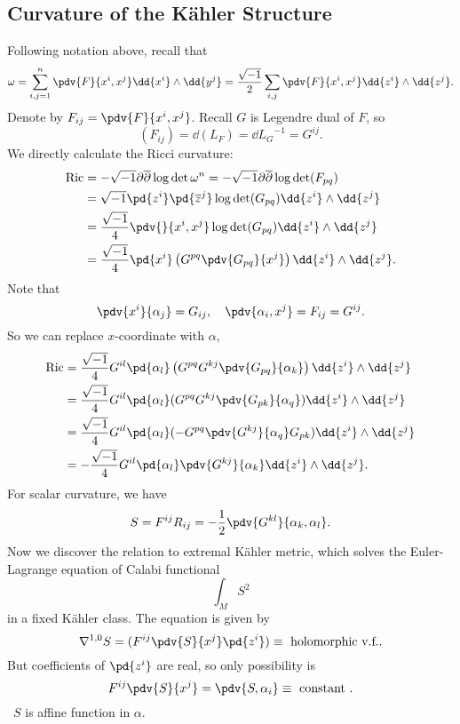 \documentclass[12pt]{article}
\theoremstyle{plain}\newtheorem{theorem}{Theorem}
\theoremstyle{definition}\newtheorem{definition}[theorem]{Definition}
\theoremstyle{definition}\newtheorem{example}[theorem]{Example}
\theoremstyle{plain}\newtheorem{axiom}[theorem]{Axiom}
\theoremstyle{plain}\newtheorem{assertion}[theorem]{Assertion}
\theoremstyle{plain}\newtheorem{corollary}[theorem]{Corollary}
\theoremstyle{plain}\newtheorem{lemma}[theorem]{Lemma}
\theoremstyle{plain}\newtheorem{proposition}[theorem]{Proposition}
\theoremstyle{plain}\newtheorem{prop}[theorem]{Proposition}
\theoremstyle{plain}\newtheorem{conjecture}[theorem]{Conjecture}
\theoremstyle{plain}\newtheorem{conj}[theorem]{Conjecture}
\theoremstyle{plain}\newtheorem{problem}[theorem]{Problem}
\theoremstyle{remark}\newtheorem{notation}[theorem]{Notation}
\theoremstyle{definition}\newtheorem*{question}{Question}
\theoremstyle{definition}\newtheorem*{answer}{Answer}
\theoremstyle{definition}\newtheorem*{goal}{Goal}
\theoremstyle{plain}\newtheorem*{application}{Application}
\theoremstyle{plain}\newtheorem*{exercise}{Exercise}
\theoremstyle{remark}\newtheorem*{remark}{Remark}
\theoremstyle{remark}\newtheorem*{note}{\small{Note}}
\numberwithin{equation}{section}
\numberwithin{theorem}{section}
\numberwithin{figure}{section}
\begin{document}
\subsection{Curvature of the K\"ahler Structure}
Following notation above, recall that \[
    \omega=\sum_{i,j=1}^{n}\pdv{F}{x^i,x^j}\dd{x^i}\wedge \dd{y^j}
    =\frac{\sqrt{-1}}{2}\sum_{i,j}\pdv{F}{x^i,x^j}\dd{z^i}\wedge \dd{z^j}
.\] Denote by \(F_{ij}=\pdv{F}{x^i,x^j}\). Recall \(G\) is Legendre dual of \(F\),
so \[
    (F_{ij})=\dd(L_F)=\dd{L_G}^{-1}=G^{ij}
.\] We directly calculate the Ricci curvature:
\begin{align*}
    \mathrm{Ric}&=-\sqrt{-1}\partial\overline{\partial} \log\det\omega^n
    =-\sqrt{-1}\partial\overline{\partial}\log\det(F_{pq}) \\
    &=\sqrt{-1}\pd{z^i}\pd{\overline{z}^j}\log\det(G_{pq})\dd{z^i}\wedge\dd{z^j} \\
    &=\frac{\sqrt{-1}}{4}\pdv{}{x^i,x^j}\log\det(G_{pq})\dd{z^i}\wedge \dd{z^j} \\
    &=\frac{\sqrt{-1}}{4}\pd{x^i}\left(G^{pq}\pdv{G_{pq}}{x^j}\right)
    \dd{z^i}\wedge \dd{z^j}
.\end{align*}
Note that \[
    \pdv{x^i}{\alpha_j}=G_{ij},\quad \pdv{\alpha_i,x^j}=F_{ij}=G^{ij}
.\] So we can replace \(x\)-coordinate with \(\alpha\),
\begin{align*}
    \mathrm{Ric}&=\frac{\sqrt{-1}}{4}G^{il}\pd{\alpha_l}\left(
    G^{pq}G^{kj}\pdv{G_{pq}}{\alpha_k}\right)\dd{z^i}\wedge \dd{z^j} \\
    &=\frac{\sqrt{-1}}{4}G^{il}\pd{\alpha_l}(G^{pq}G^{kj}\pdv{G_{pk}}{\alpha_q})
    \dd{z^i}\wedge \dd{z^j} \\
    &=\frac{\sqrt{-1}}{4}G^{il}\pd{\alpha_l}(-G^{pq}\pdv{G^{kj}}{\alpha_{q}}G_{pk})
    \dd{z^i}\wedge \dd{z^j} \\
    &=-\frac{\sqrt{-1}}{4}G^{il}\pd{\alpha_l}\pdv{G^{kj}}{\alpha_k}
    \dd{z^i}\wedge \dd{z^j}
.\end{align*}
For scalar curvature, we have \[
    S=F^{ij}R_{ij}=-\frac{1}{2}\pdv{G^{kl}}{\alpha_k,\alpha_l}
.\] Now we discover the relation to extremal K\"ahler metric, which solves the
Euler-Lagrange equation of Calabi functional \[
    \int_M S^2
\] in a fixed K\"ahler class. The equation is given by \[
    \nabla^{1,0}S=(F^{ij}\pdv{S}{x^j}\pd{z^i})\equiv \text{ holomorphic v.f.}
.\] But coefficients of \(\pd{z^i}\) are real, so only possibility is \[
    F^{ij}\pdv{S}{x^j}=\pdv{S,\alpha_i}\equiv \text{ constant }
.\] \ie\ \(S\) is affine function in \(\alpha\).
\end{document}
